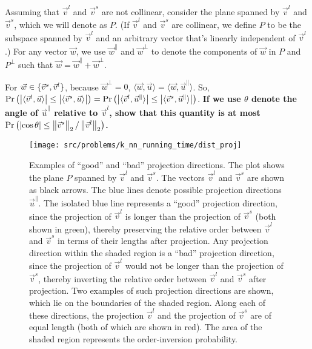 \documentclass[preview]{standalone}
\begin{document}
\begin{Parts}
Assuming that $\vec{v}^{l}$ and $\vec{v}^{s}$ are not collinear, consider the plane spanned by $\vec{v}^{l}$ and $\vec{v}^{s}$, which we will denote as $P$. (If $\vec{v}^{l}$ and $\vec{v}^{s}$ are collinear, we define $P$ to be the subspace spanned by $\vec{v}^{l}$ and an arbitrary vector that's linearly independent of $\vec{v}^{l}$.) For any vector $\vec{w}$, we use $\vec{w}^{\parallel}$ and $\vec{w}^{\perp}$ to denote the components of $\vec{w}$ in $P$ and $P^{\perp}$ such that $\vec{w}=\vec{w}^{\parallel}+\vec{w}^{\perp}$.

For $\vec{w}\in\{\vec{v}^{s}\vphantom{v^{l}},\vec{v}^{l}\}$, because $\vec{w}^{\perp}=0$, $\langle\vec{w},\vec{u}\rangle=\langle\vec{w},\vec{u}^{\parallel}\rangle$. So, $\mathrm{Pr}\left(\left|\langle\vec{v}^{l},\vec{u}\rangle\right|\leq\left|\langle\vec{v}^{s}\vphantom{v^{l}},\vec{u}\rangle\right|\right)=\mathrm{Pr}\left(\left|\langle\vec{v}^{l},\vec{u}^{\parallel}\rangle\right|\leq\left|\langle\vec{v}^{s}\vphantom{v^{l}},\vec{u}^{\parallel}\rangle\right|\right)$. {\bf If we use $\theta$ denote the angle of $\vec{u}^{\parallel}$ relative to $\vec{v}^{l}$, show that this quantity is at most $\mathrm{Pr}\left(\left|\cos\theta\right| \leq \left\Vert \vec{v}^{s}\vphantom{v^{l}}\right\Vert _{2} / \left\Vert \vec{v}^{l}\right\Vert _{2}\right)$.}

\begin{figure}[h]
    \centering
    \texttt{[image: src/problems/k\_nn\_running\_time/dist\_proj]}
    \caption{Examples of ``good'' and ``bad'' projection directions. The plot shows the plane $P$ spanned by $\vec{v}^{l}$ and $\vec{v}^{s}$. The vectors $\vec{v}^{l}$ and $\vec{v}^{s}$ are shown as black arrows. The blue lines denote possible projection directions $\vec{u}^{\parallel}$. The isolated blue line represents a ``good'' projection direction, since the projection of $\vec{v}^{l}$ is longer than the projection of $\vec{v}^{s}$ (both shown in green), thereby preserving the relative order between $\vec{v}^{l}$ and $\vec{v}^{s}$ in terms of their lengths after projection. Any projection direction within the shaded region is a ``bad'' projection direction, since the projection of $\vec{v}^{l}$ would not be longer than the projection of $\vec{v}^{s}$, thereby inverting the relative order between $\vec{v}^{l}$ and $\vec{v}^{s}$ after projection. Two examples of such projection directions are shown, which lie on the boundaries of the shaded region. Along each of these directions, the projection $\vec{v}^{l}$ and the projection of $\vec{v}^{s}$ are of equal length (both of which are shown in red). The area of the shaded region represents the order-inversion probability.}
\end{figure}




\end{Parts}
\end{document}
